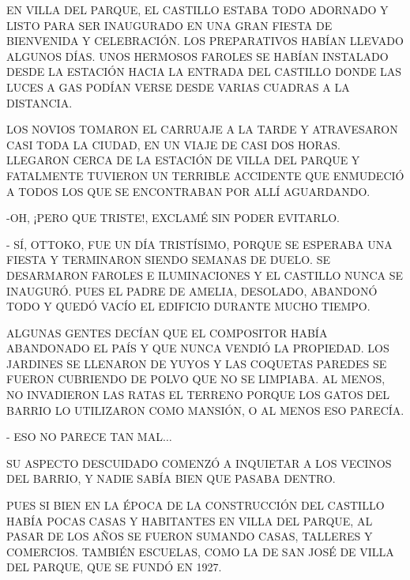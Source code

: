 EN VILLA DEL PARQUE, 	EL CASTILLO ESTABA TODO ADORNADO Y LISTO PARA SER INAUGURADO EN UNA GRAN FIESTA DE BIENVENIDA Y CELEBRACIÓN. LOS PREPARATIVOS HABÍAN LLEVADO ALGUNOS DÍAS. UNOS HERMOSOS FAROLES SE HABÍAN INSTALADO DESDE LA ESTACIÓN HACIA LA ENTRADA DEL CASTILLO DONDE LAS LUCES A GAS PODÍAN VERSE DESDE VARIAS CUADRAS A LA DISTANCIA.

LOS NOVIOS TOMARON EL CARRUAJE A LA TARDE Y  ATRAVESARON CASI TODA LA CIUDAD, EN UN VIAJE  DE CASI DOS HORAS.  LLEGARON CERCA DE LA ESTACIÓN DE VILLA DEL PARQUE Y FATALMENTE TUVIERON UN TERRIBLE ACCIDENTE QUE ENMUDECIÓ A TODOS LOS QUE SE ENCONTRABAN POR ALLÍ AGUARDANDO.

-OH, ¡PERO QUE TRISTE!, EXCLAMÉ SIN PODER EVITARLO.
\newpage
{}	
- SÍ, OTTOKO, FUE UN DÍA TRISTÍSIMO, PORQUE SE ESPERABA UNA FIESTA Y TERMINARON SIENDO SEMANAS DE DUELO. SE DESARMARON FAROLES E ILUMINACIONES Y EL CASTILLO NUNCA SE INAUGURÓ. 
PUES EL PADRE DE AMELIA, DESOLADO, ABANDONÓ TODO Y QUEDÓ VACÍO EL EDIFICIO DURANTE MUCHO TIEMPO. 

ALGUNAS GENTES  DECÍAN  QUE EL COMPOSITOR HABÍA ABANDONADO EL PAÍS Y QUE NUNCA VENDIÓ LA PROPIEDAD. LOS JARDINES SE LLENARON DE YUYOS Y LAS COQUETAS PAREDES SE FUERON CUBRIENDO DE POLVO QUE NO SE LIMPIABA. AL MENOS, NO INVADIERON LAS RATAS EL TERRENO PORQUE LOS GATOS DEL BARRIO LO UTILIZARON COMO MANSIÓN, O AL MENOS ESO PARECÍA.

- ESO NO PARECE TAN MAL$\ldots$

SU ASPECTO DESCUIDADO COMENZÓ A INQUIETAR A LOS VECINOS DEL BARRIO, Y NADIE SABÍA BIEN QUE PASABA DENTRO.

\newpage
{}
PUES SI BIEN EN LA ÉPOCA DE LA CONSTRUCCIÓN DEL CASTILLO HABÍA POCAS CASAS Y HABITANTES EN VILLA DEL PARQUE, AL PASAR DE LOS AÑOS SE FUERON SUMANDO CASAS, TALLERES Y COMERCIOS.
TAMBIÉN ESCUELAS, COMO LA DE SAN JOSÉ DE VILLA DEL PARQUE, QUE SE FUNDÓ EN 1927.

